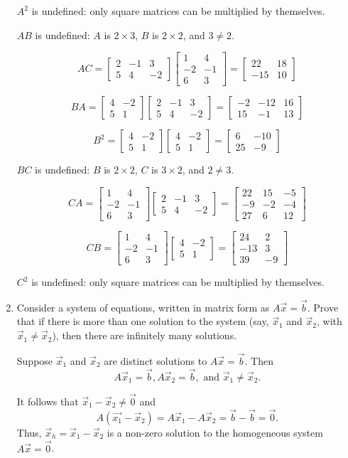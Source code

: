 \documentclass[12pt]{article}
\newcommand{\bbm}{\begin{bmatrix}}
\newcommand{\ebm}{\end{bmatrix}}
\begin{document}
\begin{enumerate}
$A^2$ is undefined: only square matrices can be multiplied by themselves.

$AB$ is undefined: $A$ is $2\times 3$, $B$ is $2\times 2$, and $3\neq 2$.

\[
AC = \bbm 2&-1&3\\5&4&-2\ebm\bbm 1&4\\-2&-1\\6&3\ebm = \bbm 22&18\\-15&10\ebm
\]

\[
BA = \bbm 4&-2\\5&1\ebm\bbm 2&-1&3\\5&4&-2\ebm = \bbm -2&-12&16\\15&-1&13\ebm
\]

\[
B^2 = \bbm 4&-2\\5&1\ebm\bbm 4&-2\\5&1\ebm=\bbm 6&-10\\25&-9\ebm
\]

$BC$ is undefined: $B$ is $2\times 2$, $C$ is $3\times 2$, and $2\neq 3$.

\[
CA = \bbm 1&4\\-2&-1\\6&3\ebm\bbm 2&-1&3\\5&4&-2\ebm = \bbm 22&15&-5\\-9&-2&-4\\27&6&12\ebm
\]

\[
CB = \bbm 1&4\\-2&-1\\6&3\ebm\bbm 4&-2\\5&1\ebm = \bbm 24&2\\-13&3\\39&-9\ebm
\]

$C^2$ is undefined: only square matrices can be multiplied by themselves.


\newpage

\item Consider a system of equations, written in matrix form as $A\vec{x}=\vec{b}$. Prove that if there is more than one solution to the system (say, $\vec{x}_1$ and $\vec{x}_2$, with $\vec{x}_1\neq \vec{x}_2$), then there are infinitely many solutions.

\bigskip

Suppose $\vec{x}_1$ and $\vec{x}_2$ are distinct solutions to $A\vec{x}=\vec{b}$. Then
\[
A\vec{x}_1=\vec{b}, A\vec{x}_2=\vec{b}, \text{ and } \vec{x}_1\neq\vec{x}_2.
\]

It follows that $\vec{x}_1- \vec{x}_2\neq \vec{0}$ and 
\[
A(\vec{x_1}-\vec{x}_2)=A\vec{x}_1-A\vec{x}_2 = \vec{b}-\vec{b}=\vec{0}.
\]
Thus, $\vec{x}_h = \vec{x}_1-\vec{x}_2$ is a non-zero solution to the homogeneous system $A\vec{x}=\vec{0}$. 


\end{enumerate}
\end{document}
